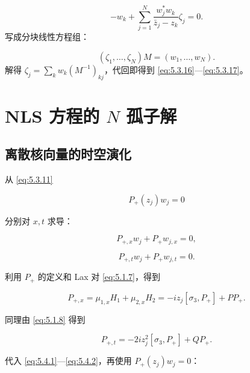 \documentclass[
    lang=cn,
    scheme=chinese,
    mode=simple,
    device=normal,
    color=blue,
    math=cm,
    thmcnt=section,
    12pt
]{elegantbook}
\begin{document}
\begin{callout}
    \begin{equation}
        -w_k+
        \sum\limits_{j=1}^{N}
        \dfrac{w_j^*w_k}{\bar z_j-z_k}\zeta_j
        =
        0.
        \tag{5.3.24}
        \label{eq:5.3.24}
    \end{equation}
    写成分块线性方程组：

    \begin{equation}
        (\zeta_1,\ldots,\zeta_N)M
        =
        (w_1,\ldots,w_N).
        \tag{5.3.25}
        \label{eq:5.3.25}
    \end{equation}
    解得 $\displaystyle \zeta_j=\sum\limits_k w_k(M^{-1})_{kj}$，代回即得到 \eqref{eq:5.3.16}---\eqref{eq:5.3.17}。
\end{callout}

\section{NLS 方程的 \texorpdfstring{$N$}{N} 孤子解}

\subsection{离散核向量的时空演化}

从 \eqref{eq:5.3.11}

\[
    P_+(z_j)w_j=0
\]

分别对 $x,t$ 求导：

\begin{equation}
    P_{+,x}w_j+P_+w_{j,x}=0,
    \tag{5.4.1}
    \label{eq:5.4.1}
\end{equation}

\begin{equation}
    P_{+,t}w_j+P_+w_{j,t}=0.
    \tag{5.4.2}
    \label{eq:5.4.2}
\end{equation}

利用 $P_+$ 的定义和 Lax 对 \eqref{eq:5.1.7}，得到

\begin{equation}
    P_{+,x}
    =
    \mu_{1,x}H_1+\mu_{2,x}H_2
    =
    -iz_j[\sigma_3,P_+]+PP_+.
    \tag{5.4.3}
    \label{eq:5.4.3}
\end{equation}

同理由 \eqref{eq:5.1.8} 得到

\begin{equation}
    P_{+,t}
    =
    -2iz_j^2[\sigma_3,P_+]+QP_+.
    \tag{5.4.4}
    \label{eq:5.4.4}
\end{equation}

代入 \eqref{eq:5.4.1}---\eqref{eq:5.4.2}，再使用 $P_+(z_j)w_j=0$：
\end{document}
